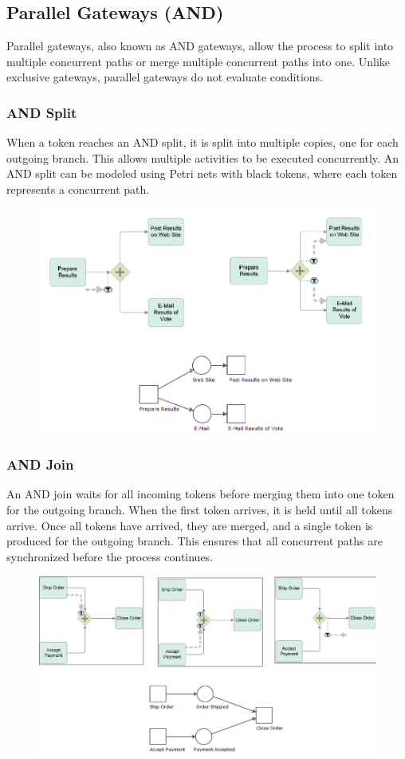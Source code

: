 \subsection{Parallel Gateways (AND)}

Parallel gateways, also known as AND gateways, allow the process to split into multiple concurrent paths or merge multiple concurrent paths into one. Unlike exclusive gateways, parallel gateways do not evaluate conditions.

\subsubsection{AND Split}

When a token reaches an AND split, it is split into multiple copies, one for each outgoing branch. This allows multiple activities to be executed concurrently. An AND split can be modeled using Petri nets with black tokens, where each token represents a concurrent path.
\begin{figure}[h!]
    \centering
    \includegraphics[width=0.75\linewidth]{capitolo 9/7.png}
\end{figure}
\subsubsection{AND Join}

An AND join waits for all incoming tokens before merging them into one token for the outgoing branch. When the first token arrives, it is held until all tokens arrive. Once all tokens have arrived, they are merged, and a single token is produced for the outgoing branch. This ensures that all concurrent paths are synchronized before the process continues.
\begin{figure}[h!]
    \centering
    \includegraphics[width=0.75\linewidth]{capitolo 9/8.png}
\end{figure}

